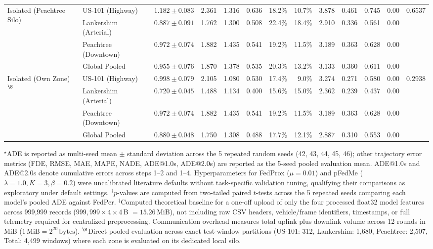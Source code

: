 \documentclass[journal]{IEEEtran}
\begin{document}
\begin{table}[!t]
{\begin{tabular}{@{}llrrrrrrrrrrr@{}}
\midrule
\multirow{4}{*}{Isolated (Peachtree Silo)} & US-101 (Highway) & $1.182 \pm 0.083$ & 2.361 & 1.316 & 0.636 & 18.2\% & 10.7\% & 3.878 & 0.461 & 0.745 & 0.00 & \multirow{4}{*}{0.6537} \\
 & Lankershim (Arterial) & $0.887 \pm 0.091$ & 1.762 & 1.300 & 0.508 & 22.4\% & 18.4\% & 2.910 & 0.336 & 0.561 & 0.00 & \\
 & Peachtree (Downtown) & $0.972 \pm 0.074$ & 1.882 & 1.435 & 0.541 & 19.2\% & 11.5\% & 3.189 & 0.363 & 0.628 & 0.00 & \\
 & Global Pooled & $0.955 \pm 0.076$ & 1.870 & 1.378 & 0.535 & 20.3\% & 13.2\% & 3.133 & 0.360 & 0.611 & 0.00 & \\
\midrule
\multirow{4}{*}{Isolated (Own Zone)$^{\S}$} & US-101 (Highway) & $0.998 \pm 0.079$ & 2.105 & 1.080 & 0.530 & 17.4\% & 9.0\% & 3.274 & 0.271 & 0.580 & 0.00 & \multirow{4}{*}{0.2938} \\
 & Lankershim (Arterial) & $0.720 \pm 0.045$ & 1.488 & 1.134 & 0.400 & 15.6\% & 15.0\% & 2.362 & 0.239 & 0.437 & 0.00 & \\
 & Peachtree (Downtown) & $0.972 \pm 0.074$ & 1.882 & 1.435 & 0.541 & 19.2\% & 11.5\% & 3.189 & 0.363 & 0.628 & 0.00 & \\
 & Global Pooled & $0.880 \pm 0.048$ & 1.750 & 1.308 & 0.488 & 17.7\% & 12.1\% & 2.887 & 0.310 & 0.553 & 0.00 & \\
\bottomrule
\end{tabular}%
}
\par\vspace{2pt}
\parbox{\textwidth}{\footnotesize $^{\star}$ADE is reported as multi-seed mean $\pm$ standard deviation across the 5 repeated random seeds (42, 43, 44, 45, 46); other trajectory error metrics (FDE, RMSE, MAE, MAPE, NADE, ADE@1.0s, ADE@2.0s) are reported as the 5-seed pooled evaluation mean. ADE@1.0s and ADE@2.0s denote cumulative errors across steps 1--2 and 1--4. Hyperparameters for FedProx ($\mu=0.01$) and pFedMe ($\lambda=1.0, K=3, \beta=0.2$) were uncalibrated literature defaults without task-specific validation tuning, qualifying their comparisons as exploratory under default settings. $^{\dagger}p$-values are computed from two-tailed paired $t$-tests across the 5 repeated seeds comparing each model's pooled ADE against FedPer. $^{\ddagger}$Computed theoretical baseline for a one-off upload of only the four processed float32 model features across 999,999 records ($999{,}999 \times 4 \times 4$\,B $= 15.26$\,MiB), not including raw CSV headers, vehicle/frame identifiers, timestamps, or full telemetry required for centralized preprocessing. Communication overhead measures total uplink plus downlink volume across 12 rounds in MiB ($1\,\text{MiB} = 2^{20}\,\text{bytes}$). $^{\S}$Direct pooled evaluation across exact test-window partitions (US-101: 312, Lankershim: 1,680, Peachtree: 2,507, Total: 4,499 windows) where each zone is evaluated on its dedicated local silo.}
\end{table}
\end{document}

